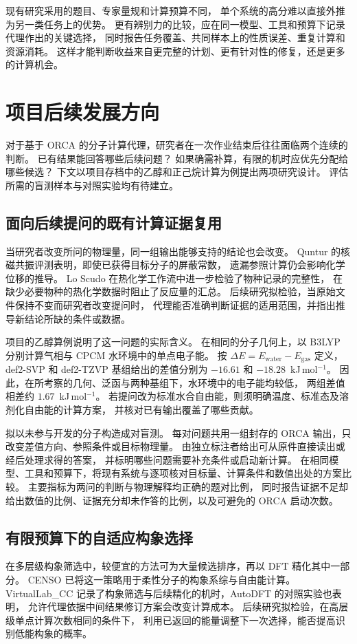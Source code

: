 \documentclass[UTF8,a4paper,11pt,fontset=fandol]{ctexart}
\begin{document}
现有研究采用的题目、专家量规和计算预算不同，
单个系统的高分难以直接外推为另一类任务上的优势。
更有辨别力的比较，应在同一模型、工具和预算下记录代理作出的关键选择，
同时报告任务覆盖、共同样本上的性质误差、重复计算和资源消耗。
这样才能判断收益来自更完整的计划、更有针对性的修复，还是更多的计算机会\cite{quntur,mr,autodft}。

\section{项目后续发展方向}
对于基于 ORCA 的分子计算代理，研究者在一次作业结束后往往面临两个连续的判断。
已有结果能回答哪些后续问题？
如果确需补算，有限的机时应优先分配给哪些候选？
下文以项目存档中的乙醇和正己烷计算为例提出两项研究设计。
评估所需的盲测样本与对照实验均有待建立。

\subsection{面向后续提问的既有计算证据复用}
当研究者改变所问的物理量，同一组输出能够支持的结论也会改变。%
Quntur 的核磁共振评测表明，即使已获得目标分子的屏蔽常数，
遗漏参照计算仍会影响化学位移的推导\cite{quntur}。%
Lo Scudo 在热化学工作流中进一步检验了物种记录的完整性，
在缺少必要物种的热化学数据时阻止了反应量的汇总\cite{tracestate}。
后续研究拟检验，当原始文件保持不变而研究者改变提问时，
代理能否准确判断证据的适用范围，并指出推导新结论所缺的条件或数据。

项目的乙醇算例说明了这一问题的实际含义。
在相同的分子几何上，以 B3LYP 分别计算气相与 CPCM 水环境中的单点电子能。
按 $\Delta E=E_{\mathrm{water}}-E_{\mathrm{gas}}$ 定义，%
def2-SVP 和 def2-TZVP 基组给出的差值分别为 $-16.61$ 和 $-18.28$~kJ\,mol$^{-1}$。
因此，在所考察的几何、泛函与两种基组下，水环境中的电子能均较低，
两组差值相差约 $1.67$~kJ\,mol$^{-1}$\cite{projectarchive}。
若提问改为标准水合自由能，则须明确温度、标准态及溶剂化自由能的计算方案，
并核对已有输出覆盖了哪些贡献。

拟以未参与开发的分子构造成对盲测。
每对问题共用一组封存的 ORCA 输出，只改变差值方向、参照条件或目标物理量。
由独立标注者给出可从原件直接读出或经后处理求得的答案，
并标明哪些问题需要补充条件或启动新计算。
在相同模型、工具和预算下，将现有系统与逐项核对目标量、计算条件和数值出处的方案比较。
主要指标为两问的判断与物理解释均正确的题对比例，
同时报告证据不足却给出数值的比例、证据充分却未作答的比例，以及可避免的 ORCA 启动次数。

\subsection{有限预算下的自适应构象选择}
在多层级构象筛选中，较便宜的方法可为大量候选排序，再以 DFT 精化其中一部分。%
CENSO 已将这一策略用于柔性分子的构象系综与自由能计算\cite{censo}。%
VirtualLab\_CC 记录了构象筛选与后续精化的机时，AutoDFT 的对照实验也表明，
允许代理依据中间结果修订方案会改变计算成本\cite{virtuallab,autodft}。
后续研究拟检验，在高层级单点计算次数相同的条件下，
利用已返回的能量调整下一次选择，能否提高识别低能构象的概率。
\end{document}

